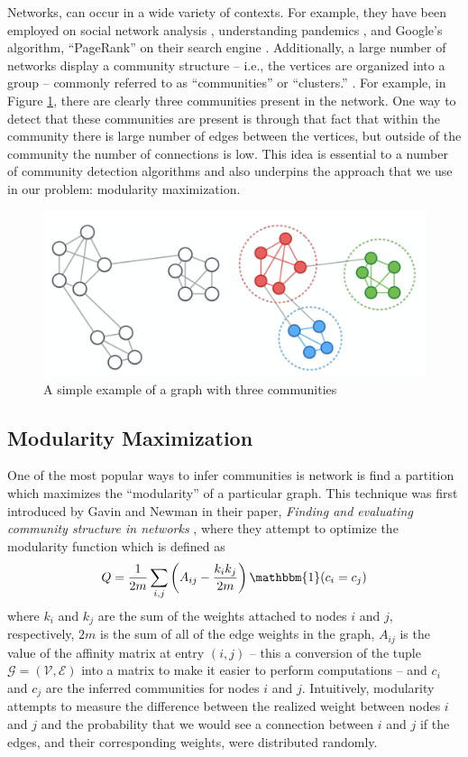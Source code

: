 \documentclass[../thesis.tex]{subfiles}
\begin{document}
Networks, can occur in a wide variety of contexts. For example, they have been
employed on social network analysis \cite{wasserman1994social}, understanding
pandemics \cite{gomez2017network}, and Google's algorithm, ``PageRank'' on their
search engine \cite{page1999pagerank}. Additionally, a large number of networks
display a community structure -- i.e., the vertices are organized into a group --
commonly referred to as ``communities'' or ``clusters.''
\cite{fortunato2016community}. For example, in Figure \ref{fig:simple_cd}, there
are clearly three communities present in the network. One way to detect that
these communities are present is through that fact that within the community
there is large number of edges between the vertices, but outside of the
community the number of connections is low. This idea is essential to a number
of community detection algorithms and also underpins the approach that we use in
our problem: modularity maximization.
\begin{figure}
    \centering
    \includegraphics[width=.7\linewidth]{images/comm_detection.pdf}
    \caption[Simple Community Detection Example]{A simple example of a graph
    with three communities}
    \label{fig:simple_cd}
\end{figure}

\subsection{Modularity Maximization}
\label{modularity-max}
One of the most popular ways to infer communities is network is find a partition
which maximizes the ``modularity'' of a particular graph. This technique was
first introduced by Gavin and Newman in their paper, \textit{Finding and
evaluating community structure in networks} \cite{newman2004finding}, where they
attempt to optimize the modularity function which is defined as
\begin{equation}
    \label{eq:modularity}
    Q = \frac{1}{2m} \sum_{i,j} \left(A_{ij} - \frac{k_i k_j}{2m}
    \right)\mathbbm{1}(c_i = c_j)
\end{equation}
where $k_i$ and $k_j$ are the sum of the weights attached to nodes $i$ and $j$,
respectively, $2m$ is the sum of all of the edge weights in the graph, $A_{ij}$
is the value of the affinity matrix at entry $(i, j)$ -- this a conversion of
the tuple $\mathcal{G} = (\mathcal{V}, \mathcal{E})$ into a matrix to make it
easier to perform computations -- and $c_i$ and $c_j$ are the inferred
communities for nodes $i$ and $j$. Intuitively, modularity attempts to measure
the difference between the realized weight between nodes $i$ and $j$ and the
probability that we would see a connection between $i$ and $j$ if the edges, and
their corresponding weights, were distributed randomly.
\end{document}
